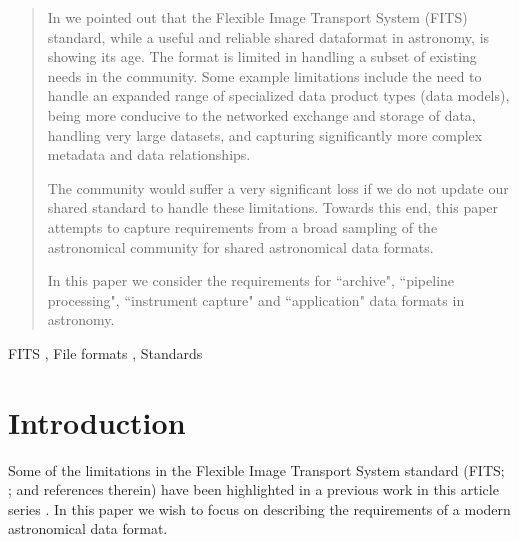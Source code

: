 \documentclass[final,authoryear,5p,times,twocolumn]{elsarticle}
\begin{document}
\begin{frontmatter}
\begin{abstract}

In  we pointed out that
the Flexible Image Transport System (FITS) standard, while a useful and
reliable shared dataformat in astronomy, is showing its age.
The format is limited in handling a subset of existing needs in the community.
Some example limitations include the need to handle an expanded range of 
specialized data product types (data models), being more conducive to the 
networked exchange and storage of data, handling very large datasets, and capturing
significantly more complex metadata and data relationships.

The community would suffer a very significant loss if we do not update our shared
standard to handle these limitations. Towards this end, this paper attempts to
capture requirements from a broad sampling of the astronomical community for 
shared astronomical data formats. 

In this paper we consider the requirements for ``archive", ``pipeline
processing", ``instrument capture"
and ``application" data formats in astronomy.

\end{abstract}

\begin{keyword}%


FITS \sep
File formats \sep
Standards
\end{keyword}

\end{frontmatter}


\newcommand{\aspconf}{ASP Conf.\ Ser}
\newcommand{\aap}{A\&A}
\newcommand{\aaps}{A\&AS}
\newcommand{\jrasc}{JRASC}
\newcommand{\qjras}{QJRAS}
\newcommand{\mnras}{MNRAS}
\newcommand{\pasp}{PASP}
\newcommand{\pasa}{PASA}
\newcommand{\apjs}{ApJS}

\section{Introduction}
\label{sec:intro}

Some of the limitations in the Flexible Image Transport System standard (FITS;
\citealt{1981A&AS...44..363W,1981A&AS...44..371G,2001A&A...376..359H,2010A&A...524A..42P}; and references therein)
have been highlighted in a previous work in this article series
\citep[][hereafter referred to as ]{2014Thommas}.
In this paper we wish to focus on describing the requirements of a modern
astronomical data format.
\end{document}
